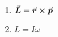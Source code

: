 

\vspace*{\fill}
\centering

\begin{enumerate}
    \item $\va*{L} = \va*{r} \cross \va*{p}$ 
    \item $L = I \omega$
\end{enumerate}

\centering
\vspace*{\fill}

